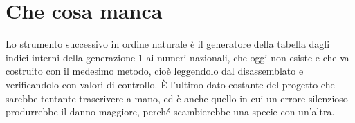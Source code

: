 \section{Che cosa manca}

Lo strumento successivo in ordine naturale è il generatore della tabella dagli indici interni della generazione 1 ai numeri nazionali, che oggi non esiste e che va costruito con il medesimo metodo, cioè leggendolo dal disassemblato e verificandolo con valori di controllo. È l'ultimo dato costante del progetto che sarebbe tentante trascrivere a mano, ed è anche quello in cui un errore silenzioso produrrebbe il danno maggiore, perché scambierebbe una specie con un'altra.
